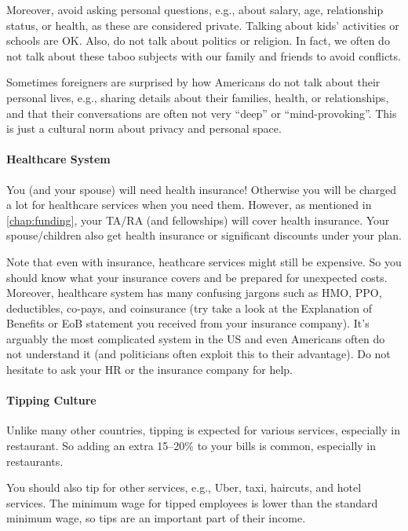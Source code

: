 \documentclass[oneside,11pt,dvipsnames]{book}
\begin{document}
Moreover, avoid asking personal questions, e.g., about salary, age, relationship status, or health, as these are considered private.  Talking about kids' activities or schools are OK. Also, do not talk about politics or religion.  In fact, we often do not talk about these taboo subjects with our family and friends to avoid conflicts.  

Sometimes foreigners are surprised by how Americans do not talk about their personal lives, e.g., sharing details about their families, health, or relationships, and that their conversations are often not very ``deep'' or ``mind-provoking''. This is just a cultural norm about privacy and personal space.

  \paragraph{Healthcare System}  You (and your spouse) will need health insurance! Otherwise you will be charged a lot for healthcare services when you need them. However, as mentioned in \autoref{chap:funding}, your  TA/RA (and fellowships)  will cover health insurance. Your spouse/children also get health insurance or significant discounts under your plan.
  
  Note that even with insurance, heathcare services might still be expensive. So you should know what your insurance covers and be prepared for unexpected costs.  Moreover, healthcare system has many confusing jargons such as HMO, PPO, deductibles, co-pays, and coinsurance (try take a look at the Explanation of Benefits or EoB statement you received from your insurance company). It's arguably the most complicated system in the US and even Americans often do not understand it (and politicians often exploit this to their advantage).  Do not hesitate to ask your HR or the insurance company for help.
  
  
  \paragraph{Tipping Culture} Unlike many other countries, tipping is expected for various services, especially in restaurant. So adding an extra 15--20\% to your bills is common, especially in restaurants.

  You should also tip for other services, e.g., Uber, taxi, haircuts, and hotel services.  The minimum wage for tipped employees is lower than the standard minimum wage, so tips are an important part of their income.
\end{document}
